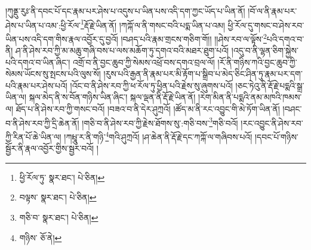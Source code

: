 །ཀུནྡུ་རུཿ་ནི་དབང་པོ་དང་རྣམ་པར་ཤེས་པ་འདུས་པ་ཡིན་པས་འདི་དག་ཀྱང་ཡོད་པ་ཡིན་ནོ། །བོ་ལ་ནི་རྣམ་པར་ཤེས་པ་ཡིན་པ་འམ་:ཕྱི་རོལ་\footnote{ཕྱི་རོལ་ཏུ་  སྣར་ཐང་།  པེ་ཅིན། }རྡོ་རྗེ་ཡིན་ནོ། །ཀཀྐོ་ལ་ནི་གསང་བའི་པདྨ་ཡིན་པ་འམ། ཕྱི་རོལ་དུ་གསང་བ་ཤེས་རབ་ཡིན་པས་འདི་དག་གིས་རྣལ་འབྱོར་དུ་བྱའོ། །བཤད་པའི་རྣམ་གྲངས་གཅིག་གོ།། །།ཤེས་རབ་ལ་ལྟོས་\footnote{བལྟས་  སྣར་ཐང་།  པེ་ཅིན། }པའི་དགའ་བ་ནི། ཤ་ནི་ཤེས་རབ་ཀྱི་མ་མཆུ་གཞི་བས་པ་ལས་མཆོག་ཏུ་དགའ་བའི་མཐར་ཐུག་པའོ། །འདུ་བ་ནི་ལྷན་ཅིག་སྐྱེས་པའི་དགའ་བ་ཡིན་ཞིང་། འགྲོ་བ་ནི་བྱང་ཆུབ་ཀྱི་སེམས་འཕྲོ་བས་དགའ་བྲལ་ལོ། །རོ་ནི་གཉིས་ཀའི་བྱང་ཆུབ་ཀྱི་སེམས་ཡོངས་སུ་སྤངས་པའི་ལུས་སོ། །རུས་པའི་རྒྱན་ནི་རྣམ་པར་མི་རྟོག་པ་སྒྲིབ་པ་མེད་ཅིང་ཤིན་ཏུ་རྣམ་པར་དག་པའི་རྣམ་པར་ཤེས་པའོ། །འོང་བ་ནི་ཤེས་རབ་ཀྱི་ཕ་རོལ་ཏུ་ཕྱིན་པའི་རྗེས་སུ་ཞུགས་པའོ། །ཅང་ཏེའུ་ནི་རྡོ་རྗེ་པདྨའི་སྒྲ་ཡིན་ལ། སྐལ་མེད་ནི་ས་བོན་གཉིས་ཡིན་ཞིང་། སྐལ་ལྡན་ནི་རྡོ་རྗེ་ཡིན་ནོ། །རེག་མིན་ནི་པདྨའི་ནམ་མཁའི་ཁམས་ལ། ཐོད་པ་ནི་ཤེས་རབ་ཀྱི་གསང་བའོ། །བཟའ་བ་ནི་དེར་ཤུཀྲའོ། །ཚོད་མ་ནི་རང་འབྱུང་གི་མེ་ཏོག་ཡིན་ནོ། །བཤང་བ་ནི་ཤེས་རབ་ཀྱི་དྲི་ཆེན་ནོ། །གཅི་བ་ནི་ཤེས་རབ་ཀྱི་རྗེས་ཐོགས་སུ་:གཅི་བས་\footnote{གཅི་བ་  སྣར་ཐང་།  པེ་ཅིན། }གཅི་བའོ། །རང་འབྱུང་ནི་ཤེས་རབ་ཀྱི་རིན་པོ་ཆེ་ཡིན་ལ། །ཀཔྤཱུ་ར་ནི་གཉི་\footnote{གཉིས་  ཅོ་ནེ། }གའི་ཤུཀྲའོ། །ཤ་ཆེན་ནི་རྡོ་རྗེ་དང་ཀཀྐོ་ལ་གཞིབས་པའོ། །དབང་པོ་གཉིས་སྦྱོར་ནི་རྣལ་འབྱོར་གྱིས་སྦྱར་བའོ། །
